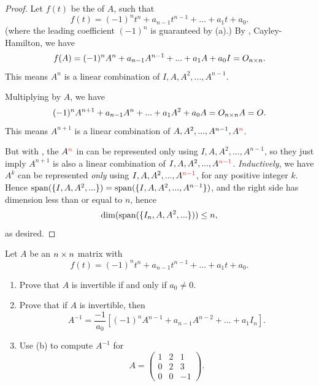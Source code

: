 \begin{proof}
Let \(f(t)\) be the \CPOLY{} of \(A\), such that
\[
    f(t) = (-1)^n t^n + a_{n - 1} t^{n - 1} + ... + a_1 t + a_0.
\]
(where the leading coefficient \((-1)^n\) is guaranteed by (a).)
By , Cayley-Hamilton, we have
\[
    f(A) = (-1)^n A^n + a_{n - 1} A^{n - 1} + ... + a_1 A + a_0 I = O_{n \times n}.
\]
This means \(A^n\) is a linear combination of \(I, A, A^2, ..., A^{n - 1}\). 

Multiplying by \(A\), we have
\[
    (-1)^n A^{n + 1} + a_{n - 1} A^{n} + ... + a_1 A^2 + a_0 A = O_{n \times n} A = O.
\]
This means \(A^{n + 1}\) is a linear combination of \(A, A^2, ..., A^{n - 1}, A^{\RED{n}}\). 

But with , the \(A^{\RED{n}}\) in  can be represented only using \(I, A, A^2, ..., A^{n - 1}\), so they just imply \(A^{n + 1}\) is also a linear combination of \(I, A, A^2, ..., A^{\RED{n - 1}}\).
\emph{Inductively}, we have \(A^k\) can be represented \emph{only} using \(I, A, A^2, ..., A^{\RED{n - 1}}\), for any positive integer \(k\).
Hence \(\operatorname{span}(\{ I, A, A^2, ... \}) = \operatorname{span}(\{ I, A, A^2, ..., A^{n - 1}\})\), and the right side has dimension less than or equal to \(n\), hence
\[
    \dim(\operatorname{span}(\{ I_n, A, A^2, ... \})) \le n,
\]
as desired.
\end{proof}

\begin{exercise} \label{exercise 5.4.18}
Let \(A\) be an \(n \times n\) matrix with \CPOLY{}
\[
    f(t) = (-1)^n t^n + a_{n - 1} t^{n - 1} + ... + a_1 t + a_0.
\]
\begin{enumerate}
\item Prove that \(A\) is invertible if and only if \(a_0 \ne 0\).
\item Prove that if \(A\) is invertible, then
\[
    A^{-1} = \frac{-1}{a_0} [(-1)^n A^{n - 1} + a_{n - 1} A^{n - 2} + ... + a_1 I_n].
\]
\item Use (b) to compute \(A^{-1}\) for
\[
    A = \begin{pmatrix} 1 & 2 & 1 \\ 0 & 2 & 3 \\ 0 & 0 & -1 \end{pmatrix}.
\]
\end{enumerate}
\end{exercise}

